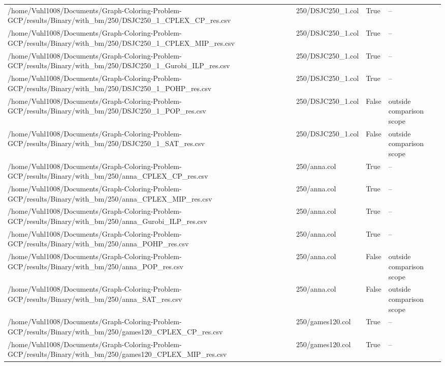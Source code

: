 \begin{table}[htbp]
\begin{tabular}{llll}
/home/Vuhl1008/Documents/Graph-Coloring-Problem-GCP/results/Binary/with\_bm/250/DSJC250\_1\_CPLEX\_CP\_res.csv & 250/DSJC250\_1.col & True & -- \\
/home/Vuhl1008/Documents/Graph-Coloring-Problem-GCP/results/Binary/with\_bm/250/DSJC250\_1\_CPLEX\_MIP\_res.csv & 250/DSJC250\_1.col & True & -- \\
/home/Vuhl1008/Documents/Graph-Coloring-Problem-GCP/results/Binary/with\_bm/250/DSJC250\_1\_Gurobi\_ILP\_res.csv & 250/DSJC250\_1.col & True & -- \\
/home/Vuhl1008/Documents/Graph-Coloring-Problem-GCP/results/Binary/with\_bm/250/DSJC250\_1\_POHP\_res.csv & 250/DSJC250\_1.col & True & -- \\
/home/Vuhl1008/Documents/Graph-Coloring-Problem-GCP/results/Binary/with\_bm/250/DSJC250\_1\_POP\_res.csv & 250/DSJC250\_1.col & False & outside comparison scope \\
/home/Vuhl1008/Documents/Graph-Coloring-Problem-GCP/results/Binary/with\_bm/250/DSJC250\_1\_SAT\_res.csv & 250/DSJC250\_1.col & False & outside comparison scope \\
/home/Vuhl1008/Documents/Graph-Coloring-Problem-GCP/results/Binary/with\_bm/250/anna\_CPLEX\_CP\_res.csv & 250/anna.col & True & -- \\
/home/Vuhl1008/Documents/Graph-Coloring-Problem-GCP/results/Binary/with\_bm/250/anna\_CPLEX\_MIP\_res.csv & 250/anna.col & True & -- \\
/home/Vuhl1008/Documents/Graph-Coloring-Problem-GCP/results/Binary/with\_bm/250/anna\_Gurobi\_ILP\_res.csv & 250/anna.col & True & -- \\
/home/Vuhl1008/Documents/Graph-Coloring-Problem-GCP/results/Binary/with\_bm/250/anna\_POHP\_res.csv & 250/anna.col & True & -- \\
/home/Vuhl1008/Documents/Graph-Coloring-Problem-GCP/results/Binary/with\_bm/250/anna\_POP\_res.csv & 250/anna.col & False & outside comparison scope \\
/home/Vuhl1008/Documents/Graph-Coloring-Problem-GCP/results/Binary/with\_bm/250/anna\_SAT\_res.csv & 250/anna.col & False & outside comparison scope \\
/home/Vuhl1008/Documents/Graph-Coloring-Problem-GCP/results/Binary/with\_bm/250/games120\_CPLEX\_CP\_res.csv & 250/games120.col & True & -- \\
/home/Vuhl1008/Documents/Graph-Coloring-Problem-GCP/results/Binary/with\_bm/250/games120\_CPLEX\_MIP\_res.csv & 250/games120.col & True & -- \\

\end{tabular}
\end{table}
